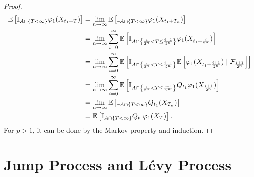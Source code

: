 \begin{proof}
    \begin{align*}
        \mathbb{E}\left[\mathbb{I}_{A \cap \left\{T < \infty\right\}}\varphi_1(X_{t_1 + T})\right] &= \lim_{n \rightarrow \infty} \mathbb{E}\left[\mathbb{I}_{A \cap \left\{T < \infty\right\}}\varphi_1(X_{t_1 + T_n})\right] \\
        &= \lim_{n \rightarrow \infty} \sum_{i=0}^\infty \mathbb{E}\left[\mathbb{I}_{A \cap \left\{\frac{i}{2^n} < T \leq \frac{i+1}{2^n}\right\}}\varphi_1(X_{t_1 + \frac{i}{2^n}})\right] \\
        &=\lim_{n \rightarrow \infty} \sum_{i=0}^\infty \mathbb{E}\left[\mathbb{I}_{A \cap \left\{\frac{i}{2^n} < T \leq \frac{i+1}{2^n}\right\}}\mathbb{E}\left[\varphi_1(X_{t_1 + \frac{i+1}{2^n}}) \mid \mathcal{F}_{\frac{i+1}{2^n}}\right]\right]\\
        &= \lim_{n \rightarrow \infty} \sum_{i=0}^\infty \mathbb{E}\left[\mathbb{I}_{A \cap \left\{\frac{i}{2^n} < T \leq \frac{i+1}{2^n}\right\}} Q_{t_1}\varphi_1(X_{\frac{i+1}{2^n}})\right] \\
        &= \lim_{n \rightarrow \infty} \mathbb{E}\left[\mathbb{I}_{A \cap \left\{T < \infty\right\}} Q_{t_1}(X_{T_n})\right] \\
        &= \mathbb{E}\left[\mathbb{I}_{A \cap \left\{T < \infty\right\}} Q_{t_1}\varphi_1(X_T)\right].
    \end{align*}
    For $p > 1$, it can be done by the Markov property and induction.
\end{proof}

\section{Jump Process and L\'evy Process}

